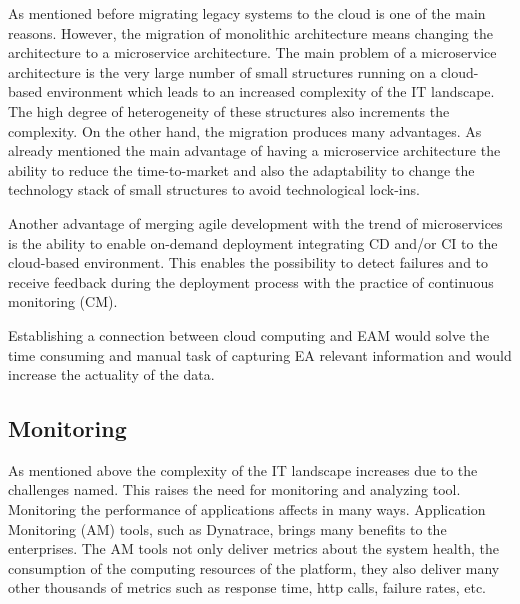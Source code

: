 As mentioned before migrating legacy systems to the cloud is one of the main reasons. However, the migration of monolithic architecture means changing the architecture to a microservice architecture. The main problem of a microservice architecture is the very large number of small structures running on a cloud-based environment which leads to an increased complexity of the IT landscape. The high degree of heterogeneity of these structures also increments the complexity.
On the other hand, the migration produces many advantages.
As already mentioned the main advantage of having a microservice architecture the ability to reduce the time-to-market and also the adaptability to change the technology stack of small structures to avoid technological lock-ins. \cite{Balalaie2016}

Another advantage of merging agile development with the trend of microservices is the ability to enable on-demand deployment integrating CD and/or CI to the cloud-based environment. This enables the possibility to detect failures and to receive feedback during the deployment process with the practice of continuous monitoring (CM). \cite{Balalaie2016}

Establishing a connection between cloud computing and EAM would solve the time consuming and manual task of capturing EA relevant information and would increase the actuality of the data.\cite{Farwick2010} 

\subsection{Monitoring}

As mentioned above the complexity of the IT landscape increases due to the challenges named. This raises the need for monitoring and analyzing tool. Monitoring the performance of applications affects in many ways. Application Monitoring (AM) tools, such as Dynatrace, brings many benefits to the enterprises. The AM tools not only deliver metrics about the system health, the consumption of the computing resources of the platform, they also deliver many other thousands of metrics such as response time, http calls, failure rates, etc.\cite{Rabl2012}

